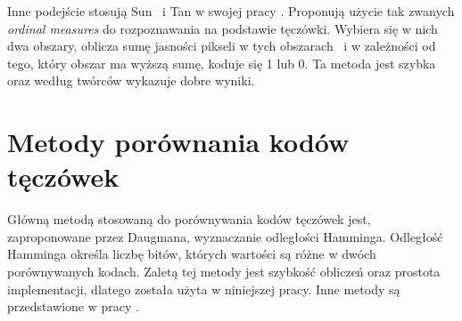 Inne podejście stosują Sun ~i Tan w swojej pracy \cite{TaSu09}. Proponują użycie tak zwanych \emph{ordinal measures} do rozpoznawania na podstawie tęczówki. Wybiera się w nich dwa obszary, oblicza sumę jasności pikseli w tych obszarach ~i w zależności od tego, który obszar ma wyższą sumę, koduje się 1 lub 0. Ta metoda jest szybka oraz według twórców wykazuje dobre wyniki.

\section{Metody porównania kodów tęczówek}
\label{sec:metodyPorownaniaKodow}
Główną metodą stosowaną do porównywania kodów tęczówek jest, zaproponowane przez Daugmana, wyznaczanie odległości Hamminga. Odległość Hamminga określa liczbę bitów, których wartości są różne w dwóch porównywanych kodach. Zaletą tej metody jest szybkość obliczeń oraz prostota implementacji, dlatego została użyta w niniejszej pracy. Inne metody są przedstawione w pracy \cite{Gl11}.
